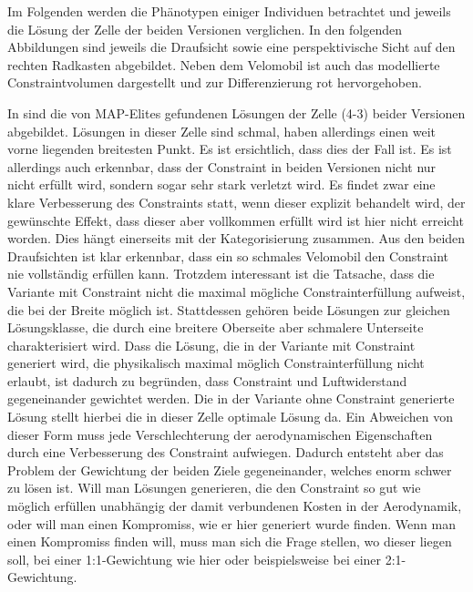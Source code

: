 Im Folgenden werden die Phänotypen einiger Individuen betrachtet und jeweils die Lösung der Zelle der beiden Versionen verglichen.
In den folgenden Abbildungen sind jeweils die Draufsicht sowie eine perspektivische Sicht auf den rechten Radkasten abgebildet.
Neben dem Velomobil ist auch das modellierte Constraintvolumen dargestellt und zur Differenzierung rot hervorgehoben.


In  sind die von MAP-Elites gefundenen Lösungen der Zelle (4-3) beider Versionen abgebildet.
Lösungen in dieser Zelle sind schmal, haben allerdings einen weit vorne liegenden breitesten Punkt.
Es ist ersichtlich, dass dies der Fall ist.
Es ist allerdings auch erkennbar, dass der Constraint in beiden Versionen nicht nur nicht erfüllt wird, sondern sogar sehr stark verletzt wird.
Es findet zwar eine klare Verbesserung des Constraints statt, wenn dieser explizit behandelt wird, der gewünschte Effekt, dass dieser aber vollkommen erfüllt wird ist hier nicht erreicht worden.
Dies hängt einerseits mit der Kategorisierung zusammen. Aus den beiden Draufsichten ist klar erkennbar, dass ein so schmales Velomobil den Constraint nie vollständig erfüllen kann.
Trotzdem interessant ist die Tatsache, dass die Variante mit Constraint nicht die maximal mögliche Constrainterfüllung aufweist, die bei der Breite möglich ist.
Stattdessen gehören beide Lösungen zur gleichen Lösungsklasse, die durch eine breitere Oberseite aber schmalere Unterseite charakterisiert wird.
Dass die Lösung, die in der Variante mit Constraint generiert wird, die physikalisch maximal möglich Constrainterfüllung nicht erlaubt, ist dadurch zu begründen, dass Constraint und Luftwiderstand gegeneinander gewichtet werden.
Die in der Variante ohne Constraint generierte Lösung stellt hierbei die in dieser Zelle optimale Lösung da.
Ein Abweichen von dieser Form muss jede Verschlechterung der aerodynamischen Eigenschaften durch eine Verbesserung des Constraint aufwiegen.
Dadurch entsteht aber das Problem der Gewichtung der beiden Ziele gegeneinander, welches enorm schwer zu lösen ist.
Will man Lösungen generieren, die den Constraint so gut wie möglich erfüllen unabhängig der damit verbundenen Kosten in der Aerodynamik, oder will man einen Kompromiss, wie er hier generiert wurde finden.
Wenn man einen Kompromiss finden will, muss man sich die Frage stellen, wo dieser liegen soll, bei einer 1:1-Gewichtung wie hier oder beispielsweise bei einer 2:1-Gewichtung.



